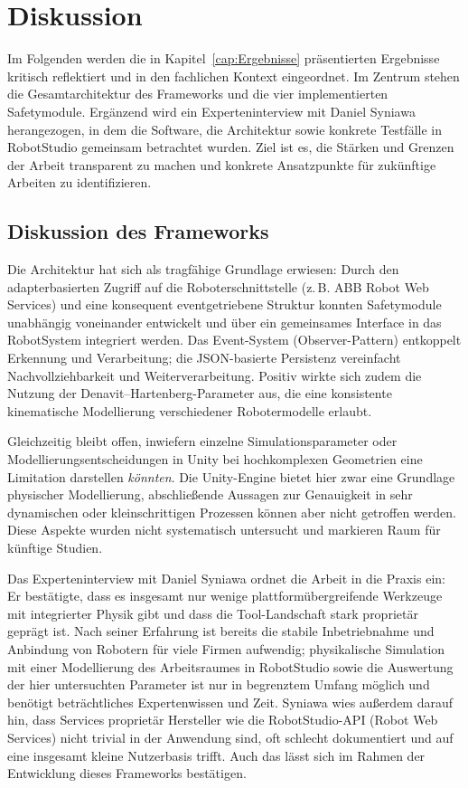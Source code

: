 \chapter{Diskussion}
\label{cap:diskussion}
Im Folgenden werden die in
Kapitel~\ref{cap:Ergebnisse} präsentierten
Ergebnisse kritisch reflektiert und in den fachlichen Kontext eingeordnet. Im
Zentrum stehen die Gesamtarchitektur des Frameworks und die vier implementierten
Safetymodule. Ergänzend wird ein Experteninterview mit Daniel Syniawa
herangezogen, in dem die Software, die Architektur sowie konkrete Testfälle in
RobotStudio gemeinsam betrachtet wurden. Ziel ist es, die Stärken und Grenzen
der Arbeit transparent zu machen und konkrete Ansatzpunkte für zukünftige
Arbeiten zu identifizieren.

\section{Diskussion des Frameworks}

Die Architektur hat sich als tragfähige Grundlage erwiesen: Durch den
adapterbasierten Zugriff auf die Roboterschnittstelle (z.\,B. ABB Robot Web
Services) und eine konsequent eventgetriebene Struktur konnten
Safetymodule unabhängig voneinander entwickelt und über ein gemeinsames
Interface in das RobotSystem integriert werden. Das Event-System
(Observer-Pattern) entkoppelt Erkennung und Verarbeitung; die JSON-basierte
Persistenz vereinfacht Nachvollziehbarkeit und Weiterverarbeitung. Positiv
wirkte sich zudem die Nutzung der Denavit–Hartenberg-Parameter aus, die eine
konsistente kinematische Modellierung verschiedener Robotermodelle erlaubt.

Gleichzeitig bleibt offen, inwiefern einzelne Simulationsparameter
oder Modellierungsentscheidungen in Unity bei hochkomplexen Geometrien eine
Limitation darstellen \emph{könnten}. Die Unity-Engine bietet hier zwar eine
Grundlage physischer Modellierung, abschließende Aussagen zur Genauigkeit in
sehr dynamischen oder kleinschrittigen Prozessen können aber nicht getroffen
werden. Diese Aspekte wurden nicht systematisch untersucht und markieren Raum
für künftige Studien.

\noindent Das Experteninterview mit Daniel Syniawa ordnet die Arbeit in die
Praxis ein: Er bestätigte, dass es insgesamt nur wenige plattformübergreifende
Werkzeuge mit integrierter Physik gibt und dass die Tool-Landschaft stark
proprietär geprägt ist. Nach seiner Erfahrung ist bereits die stabile
Inbetriebnahme und Anbindung von Robotern für viele Firmen aufwendig;
physikalische Simulation mit einer Modellierung des Arbeitsraumes in RobotStudio
sowie die Auswertung der hier untersuchten Parameter ist nur in begrenztem
Umfang möglich und benötigt beträchtliches Expertenwissen und Zeit. Syniawa wies
außerdem darauf hin, dass Services proprietär Hersteller wie die RobotStudio-API
(Robot Web Services) nicht trivial in der Anwendung sind, oft schlecht
dokumentiert und auf eine insgesamt kleine Nutzerbasis trifft. Auch das lässt
sich im Rahmen der Entwicklung dieses Frameworks bestätigen.

